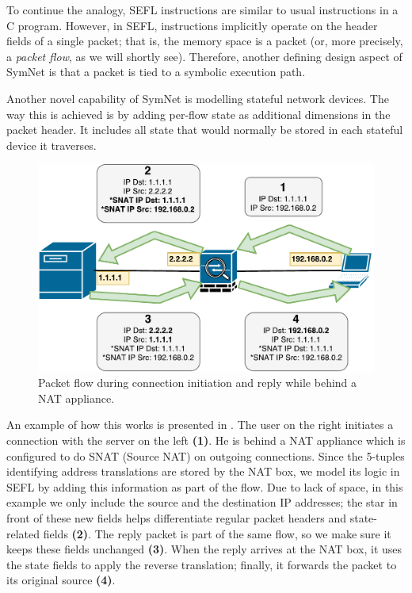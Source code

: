 To continue the analogy, SEFL instructions are similar to usual instructions in
a C program.  However, in SEFL, instructions implicitly operate on the header
fields of a single packet; that is, the memory space is a packet (or, more
precisely, a \emph{packet flow}, as we will shortly see).  Therefore, another
defining design aspect of SymNet is that a packet is tied to a symbolic
execution path.

Another novel capability of SymNet is modelling stateful network devices.  The
way this is achieved is by adding per-flow state as additional dimensions in
the packet header.  It includes all state that would normally be stored in each
stateful device it traverses.

\begin{figure}[h]
  \centering
  \includegraphics[scale=0.6]{src/img/snat-example}
  \caption{Packet flow during connection initiation and reply while behind a
  NAT appliance.}
  \label{fig:snat-example}
\end{figure}

An example of how this works is presented in
.  The user on the right initiates a
connection with the server on the left \textbf{(1)}.  He is behind a NAT
appliance which is configured to do SNAT (Source NAT) on outgoing connections.
Since the 5-tuples identifying address translations are stored by the NAT box,
we model its logic in SEFL by adding this information as part of the flow. Due
to lack of space, in this example we only include the source and the
destination IP addresses; the star in front of these new fields helps
differentiate regular packet headers and state-related fields \textbf{(2)}.
The reply packet is part of the same flow, so we make sure it keeps these
fields unchanged \textbf{(3)}.  When the reply arrives at the NAT box, it uses
the state fields to apply the reverse translation; finally, it forwards the
packet to its original source \textbf{(4)}.

